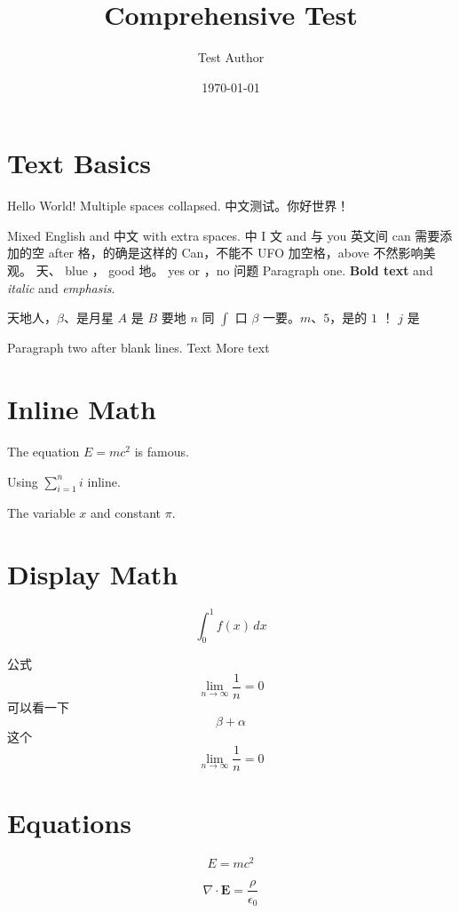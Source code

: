 \documentclass{article}
\title{Comprehensive Test}
\author{Test Author}
\date{\today}
\begin{document}
\maketitle

\section{Text Basics}

Hello World! Multiple spaces collapsed.
中文测试。你好世界！

Mixed English and 中文 with extra spaces.
中 I 文 and 与 you 英文间 can 需要添加的空 after 格，的确是这样的 Can，不能不 UFO 加空格，above 不然影响美观。
天、 blue ， good 地。 yes or ，no 问题
Paragraph one.
\textbf{Bold text} and \textit{italic} and \emph{emphasis}.

天地人，$\beta$、是月星 $A$ 是 $B$ 要地 $n$ 同 $\int$ 口 $\beta$ 一要。$m$、$5$，是的 $1$ ！ $j$ 是

Paragraph two after blank lines.
Text %
More text

\section{Inline Math}
The equation $E = mc^{2}$ is famous.

Using $ \sum_{i=1}^{n} i $ inline.

The variable $x$ and constant $\pi$.

\section{Display Math}

$$
  \int_{0}^{1} f(x) \, dx
$$

公式
$$
  \lim_{n \to \infty} \frac{1}{n} = 0
$$
可以看一下
$$
  \beta+\alpha
$$
这个
$$
  \lim_{n \to \infty} \frac{1}{n} = 0
$$

\section{Equations}

\begin{equation}
  E = mc^{2}
\end{equation}

\begin{equation*}
  \nabla \cdot \mathbf{E} = \frac{\rho}{\epsilon_{0}}
\end{equation*}
\end{document}
